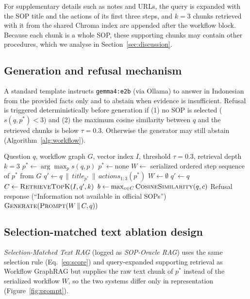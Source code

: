 \documentclass[a4paper,fleqn]{cas-sc}
\begin{document}
For supplementary details such as notes and URLs, the query is expanded with the SOP title and the actions of its first three steps, and $k=3$ chunks retrieved with it from the shared Chroma index are appended after the workflow block. Because each chunk is a whole SOP, these supporting chunks may contain other procedures, which we analyse in Section~\ref{sec:discussion}.

\subsection{Generation and refusal mechanism}
A standard template instructs \texttt{gemma4:e2b} (via Ollama) to answer in Indonesian from the provided facts only and to abstain when evidence is insufficient. Refusal is triggered deterministically before generation if (1) no SOP is selected ($s(q,p^\ast)<3$) and (2) the maximum cosine similarity between $q$ and the retrieved chunks is below $\tau=0.3$. Otherwise the generator may still abstain (Algorithm~\ref{alg:workflow}).

\begin{algorithm}[!htbp]
\caption{Execution pipeline of Process-Aware Workflow GraphRAG}
\label{alg:workflow}
\begin{algorithmic}[1]
\REQUIRE Question $q$, workflow graph $G$, vector index $I$, threshold $\tau = 0.3$, retrieval depth $k=3$
\STATE $p^\ast \leftarrow \arg\max_p s(q,p)$ 
  \STATE $p^\ast \leftarrow \text{none}$
\ENDIF
{}
  \STATE $W \leftarrow$ serialized ordered step sequence of $p^\ast$ from $G$
  \STATE $q' \leftarrow q \,\|\, \textit{title}_{p^\ast} \,\|\, \textit{actions}_{1:3}(p^\ast)$ 
\ELSE
  \STATE $W \leftarrow \emptyset$
  \STATE $q' \leftarrow q$ 
\ENDIF
\STATE $C \leftarrow \textsc{RetrieveTopK}(I, q', k)$
\STATE $b \leftarrow \max_{c \in C} \textsc{CosineSimilarity}(q, c)$
  \RETURN Refusal response (``Information not available in official SOPs'')
\ENDIF
\RETURN $\textsc{Generate}(\textsc{Prompt}(W \,\|\, C, q))$
\end{algorithmic}
\end{algorithm}

\subsection{Selection-matched text ablation design}
\label{sec:ablation-oracle}
\emph{Selection-Matched Text RAG} (logged as \emph{SOP-Oracle RAG}) uses the same selection rule (Eq.~\eqref{eq:score}) and query-expanded supporting retrieval as Workflow GraphRAG but supplies the raw text chunk of $p^\ast$ instead of the serialized workflow $W$, so the two systems differ only in representation (Figure~\ref{fig:prompt}).
\end{document}

